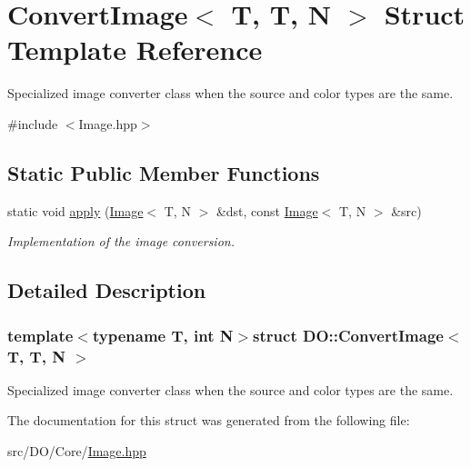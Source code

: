 \hypertarget{struct_d_o_1_1_convert_image_3_01_t_00_01_t_00_01_n_01_4}{\section{Convert\-Image$<$ T, T, N $>$ Struct Template Reference}
\label{struct_d_o_1_1_convert_image_3_01_t_00_01_t_00_01_n_01_4}
}


Specialized image converter class when the source and color types are the same.  




{\ttfamily \#include $<$Image.\-hpp$>$}

\subsection*{Static Public Member Functions}
\begin{DoxyCompactItemize}
\item 
\hypertarget{struct_d_o_1_1_convert_image_3_01_t_00_01_t_00_01_n_01_4_aa5b8da65afada1738fd9f08d33d5520f}{static void \hyperlink{struct_d_o_1_1_convert_image_3_01_t_00_01_t_00_01_n_01_4_aa5b8da65afada1738fd9f08d33d5520f}{apply} (\hyperlink{class_d_o_1_1_image}{Image}$<$ T, N $>$ \&dst, const \hyperlink{class_d_o_1_1_image}{Image}$<$ T, N $>$ \&src)}\label{struct_d_o_1_1_convert_image_3_01_t_00_01_t_00_01_n_01_4_aa5b8da65afada1738fd9f08d33d5520f}

\begin{DoxyCompactList}\small\item\em Implementation of the image conversion. \end{DoxyCompactList}\end{DoxyCompactItemize}


\subsection{Detailed Description}
\subsubsection*{template$<$typename T, int N$>$struct D\-O\-::\-Convert\-Image$<$ T, T, N $>$}

Specialized image converter class when the source and color types are the same. 

The documentation for this struct was generated from the following file\-:\begin{DoxyCompactItemize}
\item 
src/\-D\-O/\-Core/\hyperlink{_image_8hpp}{Image.\-hpp}\end{DoxyCompactItemize}
